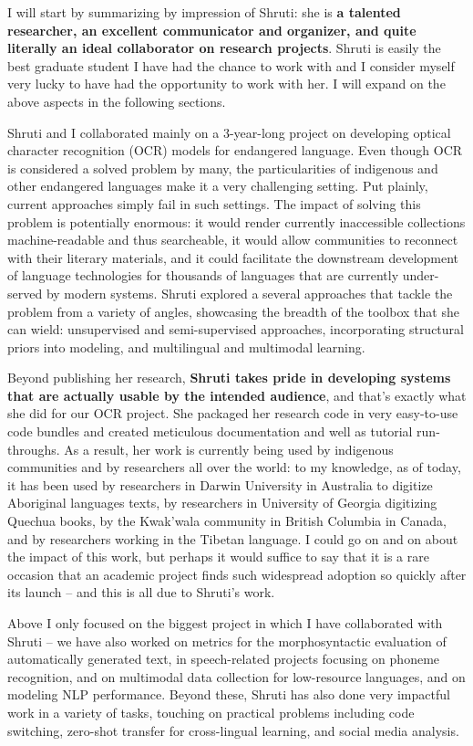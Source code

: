 \documentclass[10pt]{letter}
\begin{document}
I will start by summarizing by impression of Shruti: she is \textbf{a talented researcher, an excellent communicator and organizer, and quite literally an ideal collaborator on research projects}. Shruti is easily the best graduate student I have had the chance to work with and I consider myself very lucky to have had the opportunity to work with her.
I will expand on the above aspects in the following sections.

Shruti and I collaborated mainly on a 3-year-long project on developing optical character recognition (OCR) models for endangered language. Even though OCR is considered a solved problem by many, the particularities of indigenous and other endangered languages make it a very challenging setting. Put plainly, current approaches simply fail in such settings. The impact of solving this problem is potentially enormous: it would render currently inaccessible collections machine-readable and thus searcheable, it would allow communities to reconnect with their literary materials, and it could facilitate the downstream development of language technologies for thousands of languages that are currently under-served by modern systems. Shruti explored a several approaches that tackle the problem from a variety of angles, showcasing the breadth of the toolbox that she can wield: unsupervised and semi-supervised approaches, incorporating structural priors into modeling, and multilingual and multimodal learning. 

Beyond publishing her research, \textbf{Shruti takes pride in developing systems that are actually usable by the intended audience}, and that's exactly what she did for our OCR project. She packaged her research code in very easy-to-use code bundles and created meticulous documentation and well as tutorial run-throughs. As a result, her work is currently being used by indigenous communities and by researchers all over the world: to my knowledge, as of today, it has been used by researchers in Darwin University in Australia to digitize Aboriginal languages texts, by researchers in University of Georgia digitizing Quechua books, by the Kwak'wala community in British Columbia in Canada, and by researchers working in the Tibetan language. I could go on and on about the impact of this work, but perhaps it would suffice to say that it is a rare occasion that an academic project finds such widespread adoption so quickly after its launch -- and this is all due to Shruti's work.

Above I only focused on the biggest project in which I have collaborated with Shruti -- we have also worked on metrics for the morphosyntactic evaluation of automatically generated text, in speech-related projects focusing on phoneme recognition, and on multimodal data collection for low-resource languages, and on modeling NLP performance. Beyond these, Shruti has also done very impactful work in a variety of tasks, touching on practical problems including code switching, zero-shot transfer for cross-lingual learning, and social media analysis.
\end{document}
